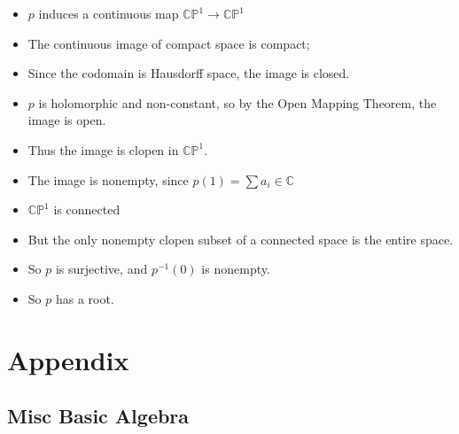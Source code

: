 \begin{itemize}
\tightlist
\item
  \(p\) induces a continuous map \({\mathbb{CP}}^1 \to {\mathbb{CP}}^1\)
\item
  The continuous image of compact space is compact;
\item
  Since the codomain is Hausdorff space, the image is closed.
\item
  \(p\) is holomorphic and non-constant, so by the Open Mapping Theorem,
  the image is open.
\item
  Thus the image is clopen in \({\mathbb{CP}}^1\).
\item
  The image is nonempty, since \(p(1) = \sum a_i \in {\mathbb{C}}\)
\item
  \({\mathbb{CP}}^1\) is connected
\item
  But the only nonempty clopen subset of a connected space is the entire
  space.
\item
  So \(p\) is surjective, and \(p^{-1}(0)\) is nonempty.
\item
  So \(p\) has a root.
\end{itemize}

\hypertarget{appendix}{%
\section{Appendix}\label{appendix}}

\hypertarget{misc-basic-algebra}{%
\subsection{Misc Basic Algebra}\label{misc-basic-algebra}}

